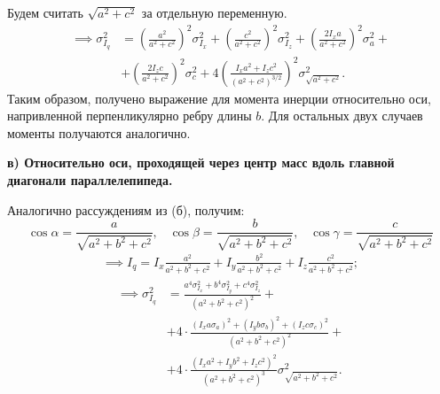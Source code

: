\documentclass[a4paper, 12pt]{article}
\begin{document}
        Будем считать $\sqrt{a^2 + c^2}$ за отдельную переменную.
        \begin{equation*}
            \begin{aligned}
            \implies \sigma_{I_q}^2 & = 
            \left(\frac{a^2}{a^2+c^2}\right)^2\sigma_{I_x}^2 + 
            \left(\frac{c^2}{a^2+c^2}\right)^2\sigma_{I_z}^2 + 
            \left(\frac{2I_xa}{a^2+c^2}\right)^2\sigma_{a}^2 + \\
            & + \left(\frac{2I_zc}{a^2+c^2}\right)^2\sigma_{c}^2 +
            4\left(\frac{I_xa^2+I_zc^2}{(a^2+c^2)^{3/2}}\right)^2\sigma_{\sqrt{a^2+c^2}}^2.
            \end{aligned}
        \end{equation*}
        Таким образом, получено выражение для момента инерции относительно оси, напривленной перпенликулярно ребру длины $b$. Для остальных двух случаев моменты получаются аналогично.

        \textbf{в) Относительно оси, проходящей через центр масс вдоль главной диагонали параллелепипеда.}

        Аналогично рассуждениям из (б), получим:
        \begin{equation*}
            \cos{\alpha} = \frac{a}{\sqrt{a^2+b^2+c^2}},
            \;\;\;
            \cos{\beta} = \frac{b}{\sqrt{a^2+b^2+c^2}},
            \;\;\;
            \cos{\gamma} = \frac{c}{\sqrt{a^2+b^2+c^2}}
        \end{equation*}
        \begin{equation*}
            \begin{aligned}
            \implies I_q = 
            I_x\frac{a^2}{a^2+b^2+c^2} + 
            I_y\frac{b^2}{a^2+b^2+c^2} + 
            I_z\frac{c^2}{a^2+b^2+c^2};
            \end{aligned}
        \end{equation*}
        \begin{equation*}
            \begin{aligned}
            \implies \sigma_{I_q}^2 & =
            \frac{a^4\sigma_{I_x}^2 + b^4\sigma_{I_y}^2 + c^4\sigma_{I_z}^2}{(a^2+b^2+c^2)^2} + \\
            & + 4\cdot \frac{(I_xa\sigma_a)^2 + (I_yb\sigma_b)^2 + (I_zc\sigma_c)^2}{(a^2+b^2+c^2)^2} + \\
            & + 4\cdot \frac{(I_xa^2 + I_yb^2 + I_zc^2)^2}{(a^2+b^2+c^2)^3}\sigma_{\sqrt{a^2+b^2+c^2}}^2.
            \end{aligned}
        \end{equation*}
\end{document}

